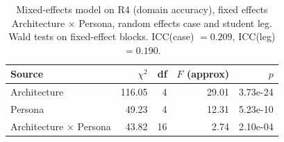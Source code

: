 \begin{table}[htbp]
\centering
\caption{Mixed-effects model on R4 (domain accuracy), fixed effects Architecture $\times$ Persona, random effects case and student leg. Wald tests on fixed-effect blocks. ICC(case) $= 0.209$, ICC(leg) $= 0.190$.}
\label{tab:anova-R4}
\begin{tabular}{lrrrr}
\toprule
Source & $\chi^2$ & df & $F$ (approx) & $p$ \\
\midrule
Architecture & 116.05 & 4 & 29.01 & 3.73e-24 \\
Persona & 49.23 & 4 & 12.31 & 5.23e-10 \\
Architecture $\times$ Persona & 43.82 & 16 & 2.74 & 2.10e-04 \\
\bottomrule
\end{tabular}
\end{table}
